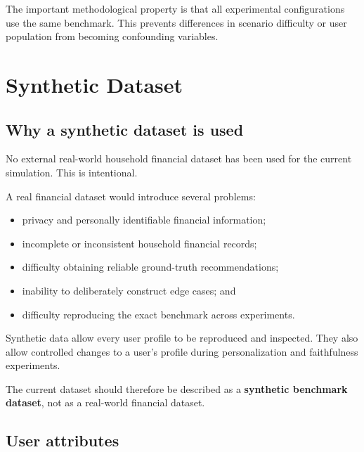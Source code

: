 \documentclass[12pt,a4paper]{article}
\begin{document}
The important methodological property is that all experimental configurations use the same benchmark. This prevents differences in scenario difficulty or user population from becoming confounding variables.

\section{Synthetic Dataset}

\subsection{Why a synthetic dataset is used}

No external real-world household financial dataset has been used for the current simulation. This is intentional.

A real financial dataset would introduce several problems:
\begin{itemize}
    \item privacy and personally identifiable financial information;
    \item incomplete or inconsistent household financial records;
    \item difficulty obtaining reliable ground-truth recommendations;
    \item inability to deliberately construct edge cases; and
    \item difficulty reproducing the exact benchmark across experiments.
\end{itemize}

Synthetic data allow every user profile to be reproduced and inspected. They also allow controlled changes to a user's profile during personalization and faithfulness experiments.

The current dataset should therefore be described as a \textbf{synthetic benchmark dataset}, not as a real-world financial dataset.

\subsection{User attributes}
\end{document}
